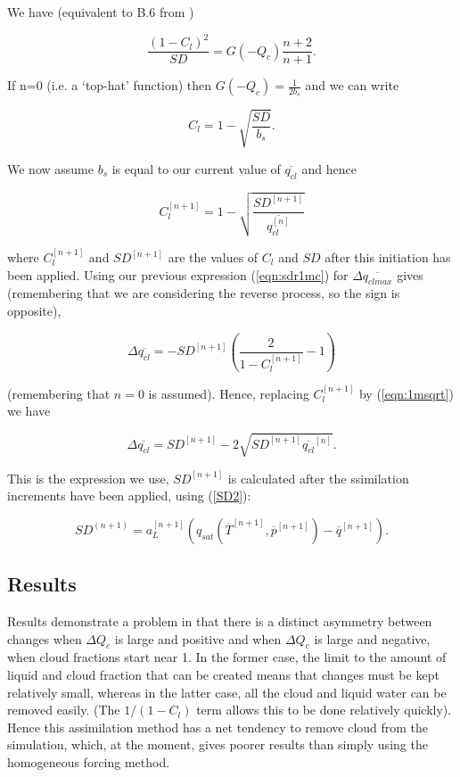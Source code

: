\documentclass{UMDP_article}
\begin{document}
We have (equivalent to B.6 from \cite{wg03})

\begin{equation}
\frac{ (1-C_l)^2 }{SD} = G(-Q_c) \frac{n+2}{n+1}.
\end{equation}

If n=0 (i.e. a `top-hat' function) then $G(-Q_c) = \frac{1}{2 b_s}$
and we can write

\begin{equation}
C_l = 1 - \sqrt{ \frac{SD}{b_s} } .
\end{equation}

We now assume $b_s$ is equal to our current value of $\overline{q_{cl}}$
and hence

\begin{equation}
C_l^{[n+1]} = 1 - \sqrt{ \frac{SD^{[n+1]}}{\overline{q_{cl}^{[n]}}} }
\label{eqn:1msqrt}
\end{equation}

where $C_l^{[n+1]}$ and $SD^{[n+1]}$ are the values of $C_l$ and $SD$ after
this initiation has been applied.
Using our previous expression (\ref{eqn:sdr1mc}) for
$\Delta \overline{q_{cl max}}$ gives (remembering that we are considering
the reverse process, so the sign is opposite),

\begin{equation}
\Delta \overline{q_{cl}} = - SD^{[n+1]}  ( \frac{2}{1-C_l^{[n+1]}} - 1 )
\end{equation}

(remembering that $n=0$ is assumed). Hence, replacing $C_l^{[n+1]}$ by
(\ref{eqn:1msqrt}) we have

\begin{equation}
\Delta \overline{q_{cl}} = SD^{[n+1]} - 2 \sqrt{ SD^{[n+1]}
\overline{q_{cl}}^{[n]} } .
\end{equation}

This is the expression we use, $SD^{[n+1]}$ is calculated after the 
ssimilation increments have been applied, using (\ref{SD2}):

\begin{equation}
SD^{(n+1)} = a_L^{[n+1]} ( q_{sat}(\overline{T}^{[n+1]},
\overline{p}^{[n+1]}) - \overline{q}^{[n+1]} ).
\end{equation}

\subsection{Results}

Results demonstrate a problem in that there is a distinct asymmetry
between changes when $\Delta Q_c$ is large and positive and when
$\Delta Q_c$ is large and negative, when
cloud fractions start near 1. In the former case, the limit to the amount of
liquid and cloud fraction that can be created means that changes must be
kept relatively small, whereas in the latter case, all the cloud and
liquid water can be removed easily. (The $1/(1-C_l)$ term allows this
to be done relatively quickly). Hence this assimilation
method has a net tendency to remove cloud from the simulation, which,
at the moment, gives poorer results than simply using the homogeneous
forcing method.
\end{document}
